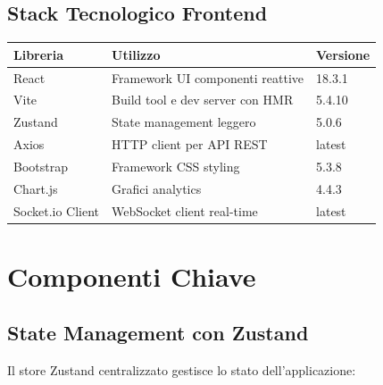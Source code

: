 \documentclass[12pt,a4paper]{report}
\begin{document}
\subsection{Stack Tecnologico Frontend}

\begin{table}[H]
    \centering
    \begin{tabular}{|l|p{10cm}|p{2cm}|}
        \hline
        \textbf{Libreria} & \textbf{Utilizzo} & \textbf{Versione} \\
        \hline
        React & Framework UI componenti reattive & 18.3.1 \\
        \hline
        Vite & Build tool e dev server con HMR & 5.4.10 \\
        \hline
        Zustand & State management leggero & 5.0.6 \\
        \hline
        Axios & HTTP client per API REST & latest \\
        \hline
        Bootstrap & Framework CSS styling & 5.3.8 \\
        \hline
        Chart.js & Grafici analytics & 4.4.3 \\
        \hline
        Socket.io Client & WebSocket client real-time & latest \\
        \hline
    \end{tabular}
\end{table}

\section{Componenti Chiave}

\subsection{State Management con Zustand}

Il store Zustand centralizzato gestisce lo stato dell'applicazione:
\end{document}
